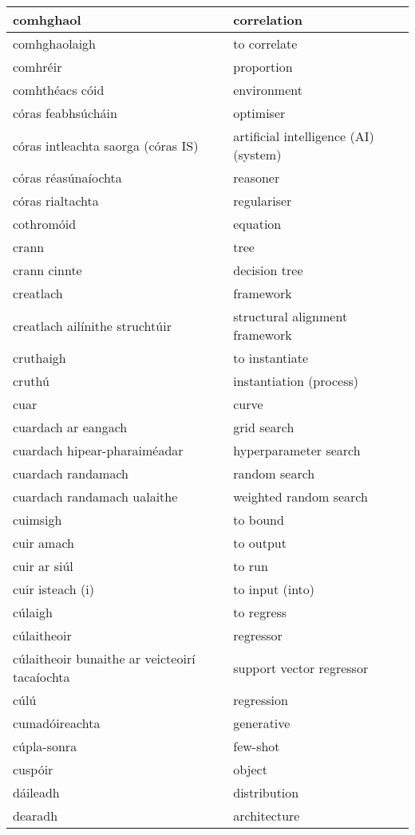 \begin{longtable}{|l|l|}
		comhghaol&correlation\\ \hline 
		comhghaolaigh&to correlate\\ \hline 
		comhréir&proportion\\ \hline 
		comhthéacs cóid&environment\\ \hline 
		córas feabhsúcháin&optimiser\\ \hline 
		córas intleachta saorga (córas IS)&artificial intelligence (AI) (system)\\ \hline 
		córas réasúnaíochta&reasoner\\ \hline 
		córas rialtachta&regulariser\\ \hline 
		cothromóid&equation\\ \hline 
		crann&tree\\ \hline 
		crann cinnte&decision tree\\ \hline 
		creatlach&framework\\ \hline 
		creatlach ailínithe struchtúir&structural alignment framework\\ \hline 
		cruthaigh&to instantiate\\ \hline 
		cruthú&instantiation (process)\\ \hline 
		cuar&curve\\ \hline 
		cuardach ar eangach&grid search\\ \hline 
		cuardach hipear-pharaiméadar&hyperparameter search\\ \hline 
		cuardach randamach&random search\\ \hline 
		cuardach randamach ualaithe&weighted random search\\ \hline 
		cuimsigh&to bound\\ \hline 
		cuir amach&to output\\ \hline 
		cuir ar siúl&to run\\ \hline 
		cuir isteach (i)&to input (into)\\ \hline 
		cúlaigh&to regress\\ \hline 
		cúlaitheoir&regressor\\ \hline 
		cúlaitheoir bunaithe ar veicteoirí tacaíochta&support vector regressor\\ \hline 
		cúlú&regression\\ \hline 
		cumadóireachta&generative\\ \hline 
		cúpla-sonra&few-shot\\ \hline 
		cuspóir&object\\ \hline 
		dáileadh&distribution\\ \hline 
		dearadh&architecture\\ \hline 

\end{longtable}
